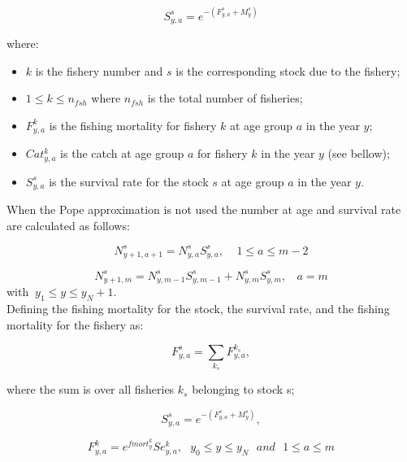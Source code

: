 \documentclass{article}
\begin{document}
\begin{equation}
S^s_{y,a}=e^{-(F^s_{y,a}+M^s_{y})}
\end{equation}

where:
\begin{itemize}
    \item $k$ is the fishery number and $s$ is the corresponding stock due to the fishery;
    
    \item $1\leq k \leq n_{fsh}$ where $n_{fsh}$ is the total number of fisheries;
   
    \item $F^k_{y,a}$ is the fishing mortality for fishery $k$ at age group $a$ in the year $y$;

    \item $Cat^k_{y,a}$ is the catch at age group $a$ for fishery $k$ in the year $y$ (see bellow);
    
    \item $S^s_{y,a}$ is the survival rate for the stock $s$ at age group $a$ in the year $y$.
\end{itemize}

\hfill

When the Pope approximation is not used the number at age and survival rate are calculated as follows:

\begin{equation}
N^s_{y+1,a+1}=N^s_{y,a}S^s_{y,a}, \ \ \ \ \ 1\leq a \leq m-2
\end{equation}

\begin{equation}
N^s_{y+1,m}=N^s_{y,m-1}S^s_{y,m-1}+N^s_{y,m}S^s_{y,m}, \ \ \ \ a = m
\end{equation}
with $\ y_1\leq y \leq y_N+1$.\\

Defining the fishing mortality for the stock, the survival rate, and the fishing mortality for the fishery as:

\begin{equation}
F^s_{y,a} = \sum_{k_s}F^{k_s}_{y,a}, 
\end{equation}

where the sum is over all fisheries $k_s$ belonging to stock s;

\begin{equation}
S^s_{y,a}=e^{-(F^s_{y,a}+M^{s}_{y})},
\end{equation}

\begin{equation}
F^k_{y,a}=e^{fmort^k_y}Se^k_{y,a}, \ \ \ y_0\leq y \leq y_N \ \ \ and  \ \ \  1\leq a \leq m
\end{equation}
\end{document}

